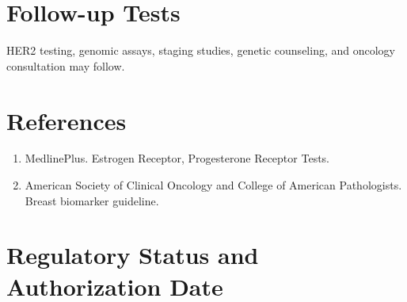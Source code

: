 \section*{Follow-up Tests} HER2 testing, genomic assays, staging studies, genetic counseling, and oncology consultation may follow.
\section*{References} \begin{enumerate}\item MedlinePlus. Estrogen Receptor, Progesterone Receptor Tests.\item American Society of Clinical Oncology and College of American Pathologists. Breast biomarker guideline.\end{enumerate}
\clearpage\section*{Regulatory Status and Authorization Date}\clearpage

